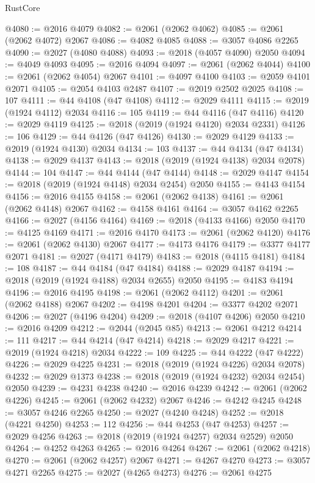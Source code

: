 \begin{lexlean}{RustCore}
\begin{coremodule}
@4080 := @2016 @4079
@4082 := @2061 (@2062 @4062)
@4085 := @2061 (@2062 @4072) @2067
@4086 := @4082 @4085
@4088 := @3057 @4086 @2265
@4090 := @2027 (@4080 @4088)
@4093 := @2018 (@4057 @4090) @2050
@4094 := @4049 @4093
@4095 := @2016 @4094
@4097 := @2061 (@2062 @4044)
@4100 := @2061 (@2062 @4054) @2067
@4101 := @4097 @4100
@4103 := @2059 @4101 @2071
@4105 := @2054 @4103 @2487
@4107 := @2019 @2502 @2025
@4108 := 107
@4111 := @44 @4108 (@47 @4108)
@4112 := @2029 @4111
@4115 := @2019 (@1924 @4112) @2034
@4116 := 105
@4119 := @44 @4116 (@47 @4116)
@4120 := @2029 @4119
@4125 := @2018 (@2019 (@1924 @4120) @2034 @2331)
@4126 := 106
@4129 := @44 @4126 (@47 @4126)
@4130 := @2029 @4129
@4133 := @2019 (@1924 @4130) @2034
@4134 := 103
@4137 := @44 @4134 (@47 @4134)
@4138 := @2029 @4137
@4143 := @2018 (@2019 (@1924 @4138) @2034 @2078)
@4144 := 104
@4147 := @44 @4144 (@47 @4144)
@4148 := @2029 @4147
@4154 := @2018 (@2019 (@1924 @4148) @2034 @2454) @2050
@4155 := @4143 @4154
@4156 := @2016 @4155
@4158 := @2061 (@2062 @4138)
@4161 := @2061 (@2062 @4148) @2067
@4162 := @4158 @4161
@4164 := @3057 @4162 @2265
@4166 := @2027 (@4156 @4164)
@4169 := @2018 (@4133 @4166) @2050
@4170 := @4125 @4169
@4171 := @2016 @4170
@4173 := @2061 (@2062 @4120)
@4176 := @2061 (@2062 @4130) @2067
@4177 := @4173 @4176
@4179 := @3377 @4177 @2071
@4181 := @2027 (@4171 @4179)
@4183 := @2018 (@4115 @4181)
@4184 := 108
@4187 := @44 @4184 (@47 @4184)
@4188 := @2029 @4187
@4194 := @2018 (@2019 (@1924 @4188) @2034 @2655) @2050
@4195 := @4183 @4194
@4196 := @2016 @4195
@4198 := @2061 (@2062 @4112)
@4201 := @2061 (@2062 @4188) @2067
@4202 := @4198 @4201
@4204 := @3377 @4202 @2071
@4206 := @2027 (@4196 @4204)
@4209 := @2018 (@4107 @4206) @2050
@4210 := @2016 @4209
@4212 := @2044 (@2045 @85)
@4213 := @2061 @4212
@4214 := 111
@4217 := @44 @4214 (@47 @4214)
@4218 := @2029 @4217
@4221 := @2019 (@1924 @4218) @2034
@4222 := 109
@4225 := @44 @4222 (@47 @4222)
@4226 := @2029 @4225
@4231 := @2018 (@2019 (@1924 @4226) @2034 @2078)
@4232 := @2029 @1373
@4238 := @2018 (@2019 (@1924 @4232) @2034 @2454) @2050
@4239 := @4231 @4238
@4240 := @2016 @4239
@4242 := @2061 (@2062 @4226)
@4245 := @2061 (@2062 @4232) @2067
@4246 := @4242 @4245
@4248 := @3057 @4246 @2265
@4250 := @2027 (@4240 @4248)
@4252 := @2018 (@4221 @4250)
@4253 := 112
@4256 := @44 @4253 (@47 @4253)
@4257 := @2029 @4256
@4263 := @2018 (@2019 (@1924 @4257) @2034 @2529) @2050
@4264 := @4252 @4263
@4265 := @2016 @4264
@4267 := @2061 (@2062 @4218)
@4270 := @2061 (@2062 @4257) @2067
@4271 := @4267 @4270
@4273 := @3057 @4271 @2265
@4275 := @2027 (@4265 @4273)
@4276 := @2061 @4275

\end{coremodule}
\end{lexlean}
